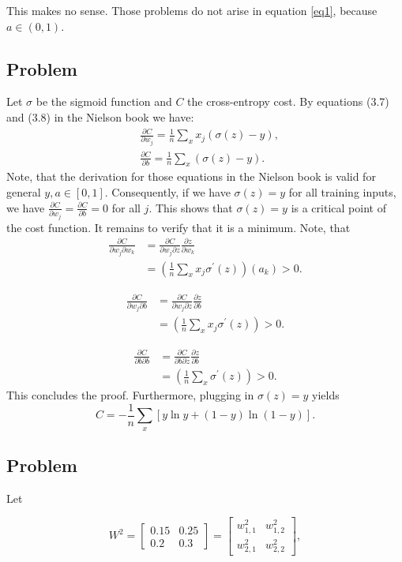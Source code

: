 \documentclass{article}
\begin{document}
This makes no sense. Those problems do not arise in equation \eqref{eq1}, because $a\in (0,1)$.

\subsection{Problem}
Let $\sigma$ be the sigmoid function and $C$ the cross-entropy cost. By equations (3.7) and (3.8) in the Nielson book we have:
$$
\begin{aligned}
	&\frac{\partial C}{\partial w_j}=\frac{1}{n} \sum_x x_j(\sigma(z)-y),
	\\&\frac{\partial C}{\partial b}=\frac{1}{n} \sum_x(\sigma(z)-y).
\end{aligned}
$$
Note, that the derivation for those equations in the Nielson book is valid for general $y,a\in [0,1]$. Consequently, if we have $\sigma(z)=y$ for all training inputs, we have $\frac{\partial C}{\partial w_j}=\frac{\partial C}{\partial b}=0$ for all $j$. This shows that $\sigma(z)=y$ is a critical point of the cost function. It remains to verify that it is a minimum. Note, that
$$
\begin{aligned}
	\frac{\partial C}{\partial w_j\partial w_k}&=\frac{\partial C}{\partial w_j\partial z}\frac{\partial z}{\partial w_k}
	\\&=\left(\frac{1}{n} \sum_x x_j\sigma^{\prime}(z)\right)\left(a_k\right)>0.
\end{aligned}
$$

$$
\begin{aligned}
	\frac{\partial C}{\partial w_j\partial b}&=\frac{\partial C}{\partial w_j\partial z}\frac{\partial z}{\partial b}
	\\&=\left(\frac{1}{n} \sum_x x_j\sigma^{\prime}(z)\right)>0.
\end{aligned}
$$

$$
\begin{aligned}
	\frac{\partial C}{\partial b\partial b}&=\frac{\partial C}{\partial b\partial z}\frac{\partial z}{\partial b}
	\\&=\left(\frac{1}{n} \sum_x\sigma^{\prime}(z)\right)>0.
\end{aligned}
$$
This concludes the proof. Furthermore, plugging in $\sigma (z)=y$ yields 
$$
C=-\frac{1}{n} \sum_x[y \ln y+(1-y) \ln (1-y)].
$$
\subsection{Problem}
Let

$$
W^2=
\begin{bmatrix}
  0.15 & 0.25 \\
  0.2 & 0.3
\end{bmatrix}=\begin{bmatrix}
  w^2_{1,1} & w^2_{1,2} \\
  w^2_{2,1} & w^2_{2,2}
\end{bmatrix},
$$
\end{document}
